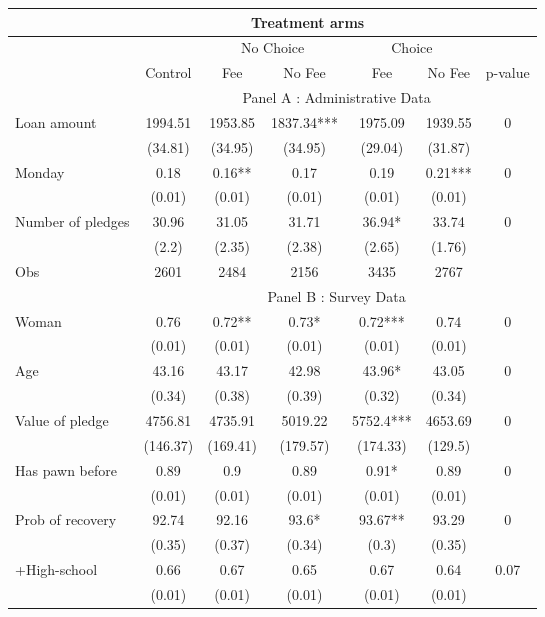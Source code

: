 \begin{tabular}{lcccccc}
\toprule
      & \multicolumn{5}{c}{Treatment arms}    &  \\
\midrule
      &       & \multicolumn{2}{c}{No Choice } & \multicolumn{2}{c}{Choice} &  \\
\midrule
\midrule
      & Control & Fee   & No Fee & Fee   & No Fee & p-value \\
\midrule
      & \multicolumn{6}{c}{Panel A : Administrative Data} \\
\midrule
\midrule
Loan amount  & 1994.51 & 1953.85 & 1837.34*** & 1975.09 & 1939.55 & 0 \\
      & (34.81) & (34.95) & (34.95) & (29.04) & (31.87) &  \\
Monday & 0.18  & 0.16** & 0.17  & 0.19  & 0.21*** & 0 \\
      & (0.01) & (0.01) & (0.01) & (0.01) & (0.01) &  \\
Number of pledges & 30.96 & 31.05 & 31.71 & 36.94* & 33.74 & 0 \\
      & (2.2) & (2.35) & (2.38) & (2.65) & (1.76) &  \\
Obs   & 2601  & 2484  & 2156  & 3435  & 2767  &  \\
\midrule
      & \multicolumn{6}{c}{Panel B : Survey Data} \\
\midrule
\midrule
Woman & 0.76  & 0.72** & 0.73* & 0.72*** & 0.74  & 0 \\
      & (0.01) & (0.01) & (0.01) & (0.01) & (0.01) &  \\
Age   & 43.16 & 43.17 & 42.98 & 43.96* & 43.05 & 0 \\
      & (0.34) & (0.38) & (0.39) & (0.32) & (0.34) &  \\
Value of pledge  & 4756.81 & 4735.91 & 5019.22 & 5752.4*** & 4653.69 & 0 \\
      & (146.37) & (169.41) & (179.57) & (174.33) & (129.5) &  \\
Has pawn before & 0.89  & 0.9   & 0.89  & 0.91* & 0.89  & 0 \\
      & (0.01) & (0.01) & (0.01) & (0.01) & (0.01) &  \\
Prob of recovery & 92.74 & 92.16 & 93.6* & 93.67** & 93.29 & 0 \\
      & (0.35) & (0.37) & (0.34) & (0.3) & (0.35) &  \\
+High-school & 0.66  & 0.67  & 0.65  & 0.67  & 0.64  & 0.07 \\
      & (0.01) & (0.01) & (0.01) & (0.01) & (0.01) &  \\

\end{tabular}
